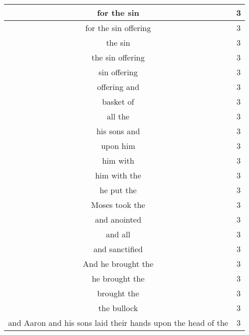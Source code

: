 \begin{center}
\begin{longtable}{|c|c|}
for the sin & 3\\ \hline 
for the sin offering & 3\\ \hline 
the sin & 3\\ \hline 
the sin offering & 3\\ \hline 
sin offering & 3\\ \hline 
offering and & 3\\ \hline 
basket of & 3\\ \hline 
all the & 3\\ \hline 
his sons and & 3\\ \hline 
upon him & 3\\ \hline 
him with & 3\\ \hline 
him with the & 3\\ \hline 
he put the & 3\\ \hline 
Moses took the & 3\\ \hline 
and anointed & 3\\ \hline 
and all & 3\\ \hline 
and sanctified & 3\\ \hline 
And he brought the & 3\\ \hline 
he brought the & 3\\ \hline 
brought the & 3\\ \hline 
the bullock & 3\\ \hline 

and Aaron and his sons laid their hands upon the head of the & 3\\ \hline 



\end{longtable}
\end{center}
